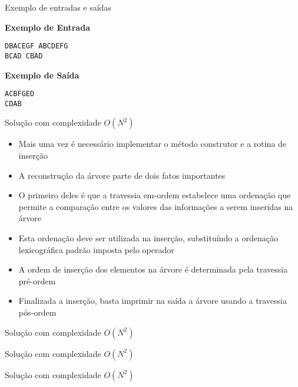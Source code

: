 \begin{frame}[fragile]{Exemplo de entradas e saídas}

\begin{minipage}[t]{0.5\textwidth}
\textbf{Exemplo de Entrada}
\begin{verbatim}
DBACEGF ABCDEFG
BCAD CBAD
\end{verbatim}
\end{minipage}
\begin{minipage}[t]{0.45\textwidth}
\textbf{Exemplo de Saída}
\begin{verbatim}
ACBFGED
CDAB
\end{verbatim}
\end{minipage}
\end{frame}

\begin{frame}[fragile]{Solução com complexidade $O(N^2)$}

    \begin{itemize}
        \item Mais uma vez é necessário implementar o método construtor e a rotina de inserção 

        \item A reconstrução da árvore parte de dois fatos importantes

        \item O primeiro deles é que a travessia em-ordem estabelece uma ordenação que permite
            a comparação entre os valores das informações a serem inseridas na árvore

        \item Esta ordenação deve ser utilizada na inserção, substituíndo a ordenação lexicográfica
            padrão imposta pelo operador 

        \item A ordem de inserção dos elementos na árvore é determinada pela travessia pré-ordem

        \item Finalizada a inserção, basta imprimir na saída a árvore usando a travessia pós-ordem
   \end{itemize}

\end{frame}

\begin{frame}[fragile]{Solução com complexidade $O(N^2)$}
\end{frame}

\begin{frame}[fragile]{Solução com complexidade $O(N^2)$}
\end{frame}

\begin{frame}[fragile]{Solução com complexidade $O(N^2)$}
\end{frame}
